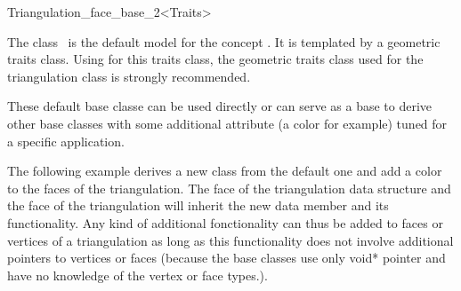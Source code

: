 

\begin{ccRefClass}{Triangulation_face_base_2<Traits>}  %


\ccDefinition
  
The class \ccRefName\ is the default  model for the concept
.
It is  templated by a geometric traits class.
Using for this traits class, the geometric traits class used for the triangulation class
is strongly recommended. 

These default base classe can be used directly or can serve as a base to derive
other base classes with some additional attribute (a color for example)
tuned for a specific application.


\ccIsModel
{}

\ccSeeAlso



\ccExample
The following example derives a new  class from the default
one and add a color to the faces of the triangulation. 
The face of the triangulation data structure
and the face of the triangulation will inherit the new data member 
and its functionality.
Any kind of additional fonctionality can thus be added to faces or vertices of a triangulation 
as long as this functionality  does not involve additional pointers to vertices or faces
(because the base classes use only void* pointer and have no knowledge
of the vertex or face types.).



\end{ccRefClass}


